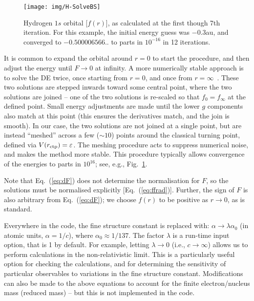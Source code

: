 \documentclass[10pt,twocolumn,a4paper]{article}%
\def\en{\ensuremath{\varepsilon}}
\begin{document}
\begin{figure}
\centering
\texttt{[image: img/H-SolveBS]}
\caption{\small Hydrogen $1s$ orbital [$f(r)$], as calculated at the first though 7th iteration.
For this example, the initial energy guess was $-0.3$au, and converged to $-0.500006566..$ to parts in $10^{-16}$ in 12 iterations.\label{fig:H-SolveBS}}
\end{figure}



It is common to expand the orbital around $r=0$ to start the procedure, and then adjust the energy until $F\to0$ at infinity.
%
A more numerically stable approach is to solve the DE twice, once starting from $r=0$, and once from $r=\infty$~\cite{JohnsonBook2007}.
These two solutions are stepped inwards toward some central point, where the two solutions are joined -- one of the two solutions is re-scaled so that $f_0=f_\infty$ at the defined point.
Small energy adjustments are made until the lower $g$ components also match at this point (this ensures the derivatives match, and the join is smooth).
In our case, the two solutions are not joined at a single point, but are instead ``meshed'' across a few ($\sim10$)  points around the classical turning point, defined via $V(r_{\rm ctp}) = \en$.
The meshing procedure acts to suppress numerical noise, and makes the method more stable.
This procedure typically allows convergence of the energies to parts in $10^{16}$;
see, e.g., Fig.~\ref{fig:H-SolveBS}.






Note that Eq.~(\ref{eq:dF}) does not determine the normalisation for $F$, so the solutions must be normalised explicitly [Eq.~(\ref{eq:ffrad})].
Further, the sign of $F$ is also arbitrary from Eq.~(\ref{eq:dF}); we choose $f(r)$ to be positive as $r\to 0$, as is standard.


Everywhere in the code, the fine structure constant is replaced with: $\alpha\to\lambda \alpha_0$ (in atomic units, $\alpha=1/c$), where $\alpha_0\approx1/137$.
The factor $\lambda$ is a run-time input option, that is 1 by default.
For example, letting $\lambda\to0$ (i.e., $c\to\infty$) allows us to perform calculations in the non-relativistic limit.
This is a particularly useful option for checking the calculations, and for determining the sensitivity of particular observables to variations in the fine structure constant.
Modifications can also be made to the above equations to account for the finite electron/nucleus mass (reduced mass) -- but this is not implemented in the code.
\end{document}
